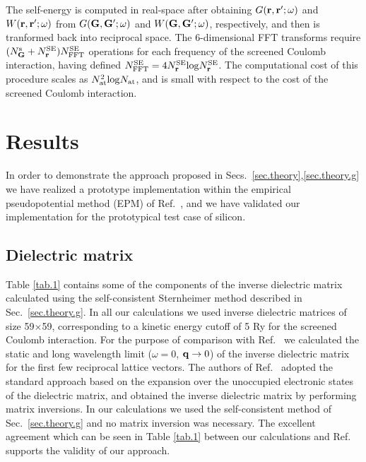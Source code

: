 \documentclass[twocolumn,prb,showpacs,superscriptaddress]{revtex4}
\def\w{\omega}
\def\q{{\bf q}}
\def\G{{\bf G}}
\def\Gp{{\bf G^\prime}}
\def\r{{\bf r}}
\def\rp{{\bf r^\prime}}
\begin{document}
The self-energy is computed in real-space after obtaining $G(\r,\rp;\w)$ and $W(\r,\rp;\w)$ 
from $G(\G,\Gp;\w)$ and $W(\G,\Gp;\w)$, respectively, and then is tranformed back into reciprocal space.
The 6-dimensional FFT transforms require $(N_\G^{\rm s}+N_\r^{\rm SE})N^{\rm SE}_{\rm FFT}$
operations for each frequency of the screened Coulomb interaction,
having defined $N^{\rm SE}_{\rm FFT}=4 N_\r^{\rm SE} {\rm log} N_\r^{\rm SE}$.
The computational cost of this procedure scales as $N_{\rm at}^2 {\rm log} N_{\rm at}$,
and is small with respect to the cost of the screened
Coulomb interaction.

\section{Results}\label{sec.results}

In order to demonstrate the approach proposed in Secs.~\ref{sec.theory},\ref{sec.theory.g}  we have realized a prototype implementation
within the empirical pseudopotential method (EPM) of Ref.\ ,
and we have validated our implementation for the prototypical test case of silicon.

\subsection{Dielectric matrix}\label{sec.5a}

Table \ref{tab.1} contains some of the components of the inverse dielectric matrix calculated using
the self-consistent Sternheimer method described in Sec.~\ref{sec.theory.g}.
In all our calculations we used inverse dielectric matrices of size 59$\times$59, 
corresponding to a kinetic energy cutoff of 5 Ry for the screened Coulomb interaction.
For the purpose of comparison with Ref.\  
we calculated the static and long wavelength limit ($\w=0$, $\q \rightarrow 0$) of the inverse dielectric matrix
for the first few reciprocal lattice vectors. 
The authors of Ref.\  adopted the standard approach based 
on the expansion over the unoccupied electronic states of the dielectric matrix, 
and obtained the inverse dielectric matrix by performing matrix inversions.
In our calculations we used the self-consistent method of Sec.~\ref{sec.theory.g}
and no matrix inversion was necessary.
The excellent agreement which can be seen in Table \ref{tab.1} between 
our calculations and Ref.~ supports the validity of our approach.
\end{document}
